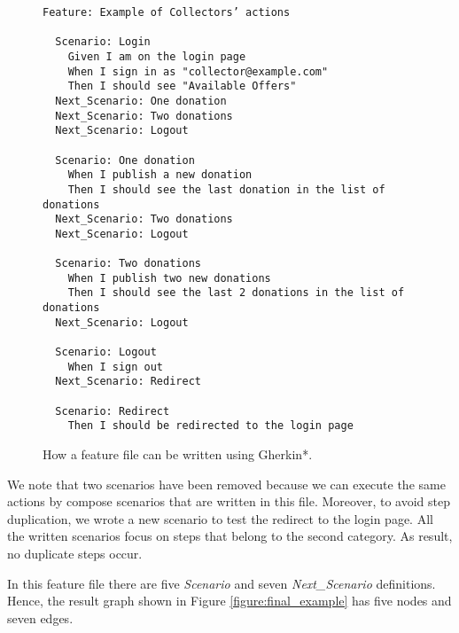 \begin{figure}[H]
\begin{verbatim}
Feature: Example of Collectors’ actions

  Scenario: Login
    Given I am on the login page
    When I sign in as "collector@example.com"
    Then I should see "Available Offers"
  Next_Scenario: One donation
  Next_Scenario: Two donations
  Next_Scenario: Logout

  Scenario: One donation
    When I publish a new donation
    Then I should see the last donation in the list of donations
  Next_Scenario: Two donations
  Next_Scenario: Logout

  Scenario: Two donations
    When I publish two new donations
    Then I should see the last 2 donations in the list of donations
  Next_Scenario: Logout

  Scenario: Logout
    When I sign out
  Next_Scenario: Redirect

  Scenario: Redirect
    Then I should be redirected to the login page
\end{verbatim}
\vspace{-1em}
\caption{How a feature file can be written using Gherkin*.}
\label{figure:kaboom}
\end{figure}

We note that two scenarios have been removed because we can execute the same actions by compose scenarios that are written in this file. Moreover, to avoid step duplication, we wrote a new scenario to test the redirect to the login page. All the written scenarios focus on steps that belong to the second category. As result, no duplicate steps occur.

In this feature file there are five \textit{Scenario} and seven \textit{Next\_Scenario} definitions. Hence, the result graph shown in Figure \ref{figure:final_example} has five nodes and seven edges.


